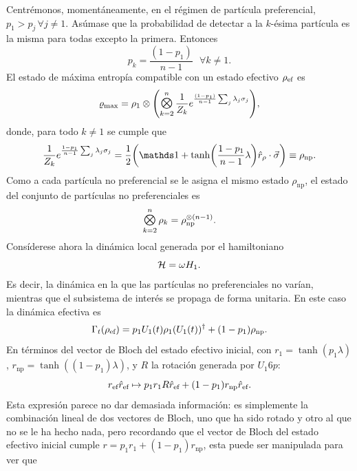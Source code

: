 Centrémonos, momentáneamente, en el régimen de partícula preferencial, \ie{} $p_{1}>p_{j}\,\forall j\neq 1$. Asúmase que la probabilidad de detectar a la $k$-ésima partícula es la misma para todas excepto la primera. Entonces
\begin{equation}
    p_{k}=\frac{(1-p_{1})}{n-1}\text{ }\forall k\neq 1.\nonumber
\end{equation}
El estado de máxima entropía compatible con un estado efectivo $\rho_{\text{ef}}$ es
\begin{equation}
    \varrho_{\max}=\rho_{1}\otimes\qty(\Motimes_{k=2}^{n}\frac{1}{Z_{k}}e^{\frac{(1-p_{1})}{n-1}\sum_{j}\lambda_{j}\pauli{j}}),\nonumber
\end{equation}
donde, para todo $k\neq 1$ se cumple que
\begin{equation}
    \frac{1}{Z_{k}}e^{\frac{1-p_{1}}{n-1}\sum_{j}\lambda_{j}\pauli{j}}=\frac{1}{2}\qty(\Id+\tanh(\frac{1-p_{1}}{n-1}\lambda)\hat{r}_{\rho}\cdot\vec{\sigma})\equiv \rho_{\text{np}}.\nonumber
\end{equation}
Como a cada partícula no preferencial se le asigna el mismo estado $\rho_{\text{np}}$, el estado del conjunto de partículas no preferenciales es
\begin{equation}
    \Motimes_{k=2}^{n}\rho_{k}=\rho_{\text{np}}^{\otimes(n-1)}\nonumber.
\end{equation}
Consíderese ahora la dinámica local generada por el hamiltoniano
\begin{equation}
    \mathcal{H}=\omega H_{1}.\nonumber
\end{equation}
Es decir, la dinámica en la que las partículas no preferenciales no varían, mientras que el subsistema de interés se propaga de forma unitaria. En este caso la dinámica efectiva es
\begin{equation}
    \Gamma_{t}(\rho_{\text{ef}})=p_{1}U_{1}(t)\rho_{1}(U_{1}(t))^{\dag}+(1-p_{1})\rho_{\text{np}}.\nonumber
\end{equation}
En términos del vector de Bloch del estado efectivo inicial, con $r_{1}=\tanh(p_{1}\lambda)$, $r_{\text{np}}=\tanh((1-p_{1})\lambda)$, y $R$ la rotación generada por $U_{1}6p$:
\begin{equation}
    r_{\text{ef}}\hat{r}_{\text{ef}}\mapsto p_{1}r_{1}R\hat{r}_{\text{ef}}+(1-p_{1})r_{\text{np}}\hat{r}_{\text{ef}}.\nonumber
\end{equation}
Esta expresión parece no dar demasiada información: es simplemente la combinación lineal de dos vectores de Bloch, uno que ha sido rotado y otro al que no se le ha hecho nada, pero recordando que el vector de Bloch del estado efectivo inicial cumple $r=p_{1}r_{1}+(1-p_{1})r_{\text{np}}$, esta puede ser manipulada para ver que

